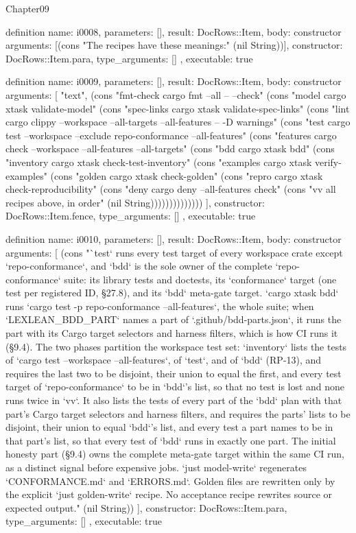 \begin{lexlean}{Chapter09}
\begin{semanticmodule}
definition{
  name: i0008,
  parameters: [],
  result: DocRows::Item,
  body: constructor{
    arguments: [(cons "The recipes have these meanings:" (nil String))],
    constructor: DocRows::Item.para,
    type_arguments: []
  },
  executable: true
}

definition{
  name: i0009,
  parameters: [],
  result: DocRows::Item,
  body: constructor{
    arguments: [
      "text",
      (cons "fmt-check   cargo fmt --all -- --check" (cons "model       cargo xtask validate-model" (cons "spec-links  cargo xtask validate-spec-links" (cons "lint        cargo clippy --workspace --all-targets --all-features -- -D warnings" (cons "test        cargo test --workspace --exclude repo-conformance --all-features" (cons "features    cargo check --workspace --all-features --all-targets" (cons "bdd         cargo xtask bdd" (cons "inventory   cargo xtask check-test-inventory" (cons "examples    cargo xtask verify-examples" (cons "golden      cargo xtask check-golden" (cons "repro       cargo xtask check-reproducibility" (cons "deny        cargo deny --all-features check" (cons "vv          all recipes above, in order" (nil String))))))))))))))
    ],
    constructor: DocRows::Item.fence,
    type_arguments: []
  },
  executable: true
}

definition{
  name: i0010,
  parameters: [],
  result: DocRows::Item,
  body: constructor{
    arguments: [
      (cons "`test` runs every test target of every workspace crate except `repo-conformance`, and `bdd` is the sole owner of the complete `repo-conformance` suite: its library tests and doctests, its `conformance` target (one test per registered ID, §27.8), and its `bdd` meta-gate target. `cargo xtask bdd` runs `cargo test -p repo-conformance --all-features`, the whole suite; when `LEXLEAN_BDD_PART` names a part of `.github/bdd-parts.json`, it runs the part with its Cargo target selectors and harness filters, which is how CI runs it (§9.4). The two phases partition the workspace test set: `inventory` lists the tests of `cargo test --workspace --all-features`, of `test`, and of `bdd` (RP-13), and requires the last two to be disjoint, their union to equal the first, and every test target of `repo-conformance` to be in `bdd`'s list, so that no test is lost and none runs twice in `vv`. It also lists the tests of every part of the `bdd` plan with that part's Cargo target selectors and harness filters, and requires the parts' lists to be disjoint, their union to equal `bdd`'s list, and every test a part names to be in that part's list, so that every test of `bdd` runs in exactly one part. The initial honesty part (§9.4) owns the complete meta-gate target within the same CI run, as a distinct signal before expensive jobs. `just model-write` regenerates `CONFORMANCE.md` and `ERRORS.md`. Golden files are rewritten only by the explicit `just golden-write` recipe. No acceptance recipe rewrites source or expected output." (nil String))
    ],
    constructor: DocRows::Item.para,
    type_arguments: []
  },
  executable: true
}


\end{semanticmodule}
\end{lexlean}
